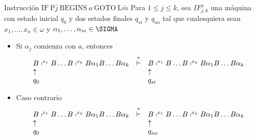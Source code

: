\begin{frame}
  \begin{block}{Instrucción $\mathrm{IF} \ \mathrm{P}\bar{j} \ \mathrm{BEGINS} \ a \ \mathrm{GOTO} \ \mathrm{L}\bar{m}$}
    \PN Para $1 \leq j \leq k$, sea $IF_{j,k}^{a}$ una máquina con estado inicial $q_{0}$ y dos estados finales $q_{si}$ y
    $q_{no}$ tal que cualesquiera sean $x_{1}, \dotsc, x_{n} \in \omega$ y $\alpha_{1}, \dotsc,\alpha_{m} \in \SIGMA$
    \begin{itemize}
      \item Si $\alpha_{j}$ comienza con $a$, entonces
      \[
        \begin{array}{lcl}
          B \shortmid^{x_{1}} B \dotsc B \shortmid^{x_{k}} B \alpha_{1} B \dotsc B \alpha_{k} &\overset{\ast}{\vdash}& B
            \shortmid^{x_{1}} B \dotsc B \shortmid^{x_{k}} B \alpha_{1} B \dotsc B \alpha_{k} \\
          \uparrow && \uparrow \\
          q_{0} && q_{si}
        \end{array}
      \]

      \item Caso contrario
      \[
        \begin{array}{lcl}
          B \shortmid^{x_{1}} B \dotsc B \shortmid^{x_{k}} B \alpha_{1} B \dotsc B \alpha_{k} &\overset{\ast}{\vdash}& B
            \shortmid^{x_{1}} B \dotsc B \shortmid^{x_{k}} B \alpha_{1} B \dotsc B \alpha_{k} \\
          \uparrow && \uparrow \\
          q_{0} && q_{no}
        \end{array}
      \]
    \end{itemize}
  \end{block}
\end{frame}

